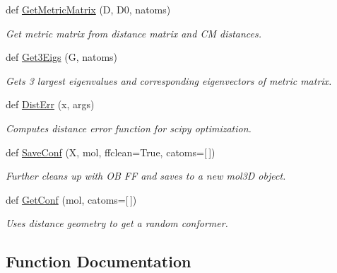 \begin{DoxyCompactItemize}
def \hyperlink{namespacemolSimplify_1_1Scripts_1_1distgeom_a4cab2a5d58e3b87a21782fe674644556}{Get\+Metric\+Matrix} (D, D0, natoms)
\begin{DoxyCompactList}\small\item\em Get metric matrix from distance matrix and CM distances. \end{DoxyCompactList}\item 
def \hyperlink{namespacemolSimplify_1_1Scripts_1_1distgeom_ae35bf82aac3a079973c82389260e6437}{Get3\+Eigs} (G, natoms)
\begin{DoxyCompactList}\small\item\em Gets 3 largest eigenvalues and corresponding eigenvectors of metric matrix. \end{DoxyCompactList}\item 
def \hyperlink{namespacemolSimplify_1_1Scripts_1_1distgeom_ac30129928233e408ea43718d61a583c1}{Dist\+Err} (x, args)
\begin{DoxyCompactList}\small\item\em Computes distance error function for scipy optimization. \end{DoxyCompactList}\item 
def \hyperlink{namespacemolSimplify_1_1Scripts_1_1distgeom_a2930b926314c9aca7d5a27808147eb03}{Save\+Conf} (X, mol, ffclean=True, catoms=\mbox{[}$\,$\mbox{]})
\begin{DoxyCompactList}\small\item\em Further cleans up with OB FF and saves to a new mol3D object. \end{DoxyCompactList}\item 
def \hyperlink{namespacemolSimplify_1_1Scripts_1_1distgeom_ab4b658be4a3b69023b662b3268e73f66}{Get\+Conf} (mol, catoms=\mbox{[}$\,$\mbox{]})
\begin{DoxyCompactList}\small\item\em Uses distance geometry to get a random conformer. \end{DoxyCompactList}\end{DoxyCompactItemize}


\subsection{Function Documentation}
\mbox{\label{namespacemolSimplify_1_1Scripts_1_1distgeom_a755cf7c0dbe32d75e3aa2c43ce1b8093}} 
